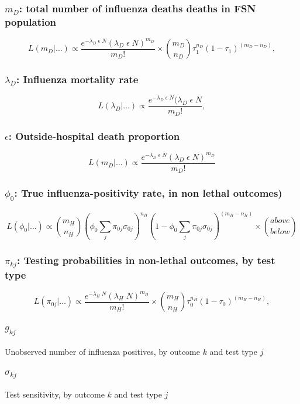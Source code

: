\documentclass{article}[12pt]
\begin{document}
\subsubsection*{$m_D$: total number of influenza deaths deaths in FSN population}
%
%
\begin{equation}
\label{eq:m_D}
L(m_D|\ldots) \propto \frac{e^{-\lambda_D\;\epsilon  \; N} (\lambda_D\;\epsilon  \; N)^{m_D}}{m_D!}\times \binom{m_D}{n_D} \tau_1^{n_D} (1 - \tau_1)^{(m_D - n_D)},
\end{equation}
%
%
\subsubsection*{$\lambda_D$: Influenza mortality rate}
%
\begin{equation}
\label{eq:lam_D}
L(\lambda_D|\ldots) \propto \frac{e^{-\lambda_D\;\epsilon  \; N} (\lambda_D\;\epsilon  \; N}{m_D!},
\end{equation}
%
\subsubsection*{$\epsilon$: Outside-hospital death proportion}
%
\begin{equation}
\label{eq:p_osh}
L(m_D|\ldots) \propto \frac{e^{-\lambda_D\;\epsilon  \; N} (\lambda_D\;\epsilon  \; N)^{m_D}}{m_D!}
\end{equation}
%
\subsubsection*{$\phi_0$: True influenza-positivity rate, in non lethal outcomes)}
%
\begin{equation}
\label{eq:phi_0}
L(\phi_0|\ldots) \propto \binom{m_H}{n_H} \left(\phi_0 \sum_{j} \pi_{0j} \sigma_{0j}\right)^{n_H} (1 - \phi_0 \sum_{j} \pi_{0j} \sigma_{0j})^{(m_H - n_H)} \times
\binom{above}{below}
\end{equation}
%

\subsubsection*{$\pi_{kj}$: Testing probabilities in non-lethal outcomes, by test type}
%
\begin{equation}
\label{eq:pi_kj}
L(\pi_{0j}|\ldots) \propto \frac{e^{-\lambda_H \; N} (\lambda_H \; N)^{m_H}}{m_H!}\times \binom{m_H}{n_H} \tau_0^{n_H} (1 - \tau_0)^{(m_H - n_H)},
\end{equation}
%
	
\subsubsection*{$g_{kj}$} Unobserved number of influenza positives, by outcome $k$ and test type $j$
\subsubsection*{$\sigma_{kj}$} Test sensitivity, by outcome $k$ and test type $j$
%
\end{document}
